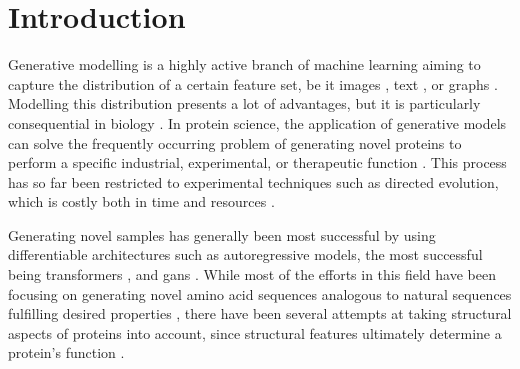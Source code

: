 \chapter{Introduction}


Generative modelling is a highly active branch of machine learning aiming to
capture the distribution of a certain feature set, be it images
\citep{saharia2022hierarchical,ramesh2022hierarchical}, text
\citep{brown2020language}, or graphs \citep{guo2020systematic}. Modelling this
distribution presents a lot of advantages, but it is particularly consequential
in biology \citep{lopez2020enhancing,strokach2022deep}. In protein science, the
application of generative models can solve the frequently occurring problem of
generating novel proteins to perform a specific industrial, experimental, or
therapeutic function \citep{jendrusch2021alphadesign, madani2020progen,
  madani2021deep}. This process has so far been restricted to experimental
techniques such as directed evolution, which is costly both in time and
resources \citep{wang2021directed}.

Generating novel samples has generally been most successful by using
differentiable architectures such as autoregressive models, the most successful
being transformers \citep{vaswani2017attention}, and \acrfull{gans}
\citep{goodfellow2014generative}. While most of the efforts in this field have
been focusing on generating novel amino acid sequences analogous to natural
sequences fulfilling desired properties
\citep{riesselman2018deep,biswas2021low,weinstein2021structured,repecka2021expanding,kucera2022conditional},
there have been several attempts at taking structural aspects of proteins into
account, since structural features ultimately determine a protein's function
\citep{anand2018generative, ingraham2019generative, maddhuri2021protein}.

